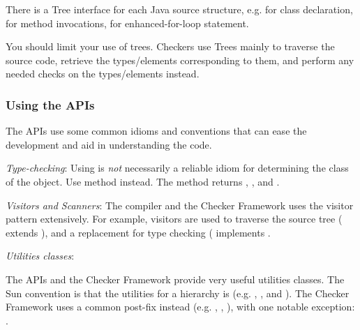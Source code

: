There is a Tree interface for each Java source structure, e.g.
 for class declaration, 
for method invocations,  for enhanced-for-loop
statement.

You should limit your use of trees. Checkers use Trees mainly to
traverse the source code, retrieve the types/elements corresponding to
them, and perform any needed checks on the types/elements instead.

\subsubsection{Using the APIs}

The APIs use some common idioms and conventions that can ease the
development and aid in understanding the code.

\emph{Type-checking}:
Using  is \emph{not} necessarily a reliable idiom for
determining the class of the object.  Use  method
instead.  The method returns ,
, and .

\emph{Visitors and Scanners}:
The compiler and the Checker Framework uses the visitor pattern
extensively. For example, visitors are used to traverse the source
tree ( extends
), and a replacement for type
checking ( implements
.

\emph{Utilities classes}:

The APIs and the Checker Framework provide very useful utilities
classes. The Sun convention is that the utilities for a 
hierarchy is  (e.g. ,
, and ).
The Checker Framework uses a common  post-fix instead
(e.g. , ,
), with one notable exception:
.



